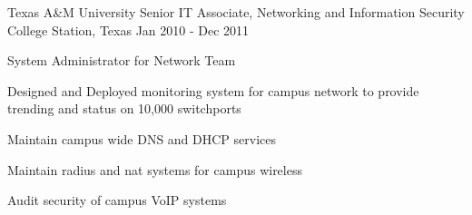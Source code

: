 \begin{cventries}
  \cventry
    {Texas A\&M University} %
    {Senior IT Associate, Networking and Information Security} %
    {College Station, Texas} %
    {Jan 2010 - Dec 2011} %
    {
      \begin{cvitems} %
        \item {System Administrator for Network Team}
        \item {Designed and Deployed monitoring system for campus network to provide trending and status on 10,000 switchports}
        \item {Maintain campus wide DNS and DHCP services}
        \item {Maintain radius and nat systems for campus wireless}
        \item {Audit security of campus VoIP systems}
      \end{cvitems}
    }

\end{cventries}
